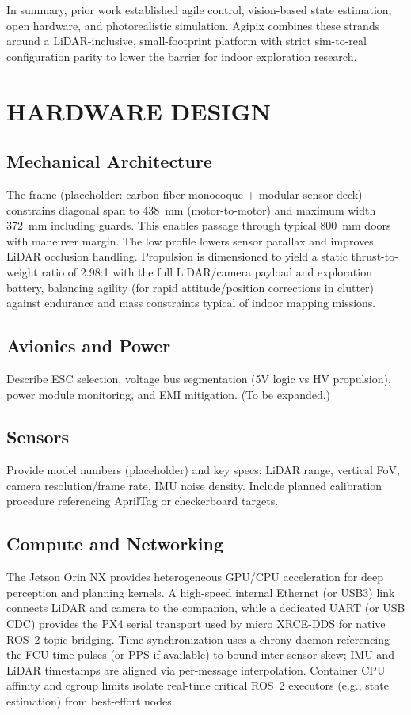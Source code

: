 \documentclass[letterpaper, 10 pt, conference]{ieeeconf}  %
\begin{document}
In summary, prior work established agile control, vision-based state estimation, open hardware, and photorealistic simulation. Agipix combines these strands around a LiDAR-inclusive, small-footprint platform with strict sim-to-real configuration parity to lower the barrier for indoor exploration research.

\section{HARDWARE DESIGN}
\subsection{Mechanical Architecture}
The frame (placeholder: carbon fiber monocoque + modular sensor deck) constrains diagonal span to 438~mm (motor-to-motor) and maximum width 372~mm including guards. This enables passage through typical 800~mm doors with maneuver margin. The low profile lowers sensor parallax and improves LiDAR occlusion handling. Propulsion is dimensioned to yield a static thrust-to-weight ratio of 2.98:1 with the full LiDAR/camera payload and exploration battery, balancing agility (for rapid attitude/position corrections in clutter) against endurance and mass constraints typical of indoor mapping missions.
\subsection{Avionics and Power}
Describe ESC selection, voltage bus segmentation (5V logic vs HV propulsion), power module monitoring, and EMI mitigation. (To be expanded.)
\subsection{Sensors}
Provide model numbers (placeholder) and key specs: LiDAR range, vertical FoV, camera resolution/frame rate, IMU noise density. Include planned calibration procedure referencing AprilTag or checkerboard targets.
\subsection{Compute and Networking}
The Jetson Orin NX provides heterogeneous GPU/CPU acceleration for deep perception and planning kernels. A high-speed internal Ethernet (or USB3) link connects LiDAR and camera to the companion, while a dedicated UART (or USB CDC) provides the PX4 serial transport used by micro XRCE-DDS for native ROS~2 topic bridging. Time synchronization uses a chrony daemon referencing the FCU time pulses (or PPS if available) to bound inter-sensor skew; IMU and LiDAR timestamps are aligned via per-message interpolation. Container CPU affinity and cgroup limits isolate real-time critical ROS~2 executors (e.g., state estimation) from best-effort nodes.
\end{document}

